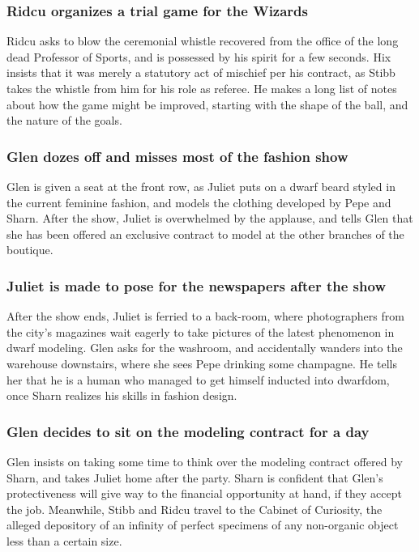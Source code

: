 \subsubsection{\Gls{Ridcu} organizes a trial game for the Wizards}
\Gls{Ridcu} asks to blow the ceremonial whistle recovered from the office of the long dead Professor
of Sports, and is possessed by his spirit for a few seconds. \Gls{Hix} insists that it was merely
a statutory act of mischief per his contract, as \Gls{Stibb} takes the whistle from him for his
role as referee. He makes a long list of notes about how the game might be improved, starting with
the shape of the ball, and the nature of the goals.

\subsubsection{\Gls{Glen} dozes off and misses most of the fashion show}
\Gls{Glen} is given a seat at the front row, as \Gls{Juliet} puts on a dwarf beard styled in the
current feminine fashion, and models the clothing developed by \Gls{Pepe} and \Gls{Sharn}. After
the show, \Gls{Juliet} is overwhelmed by the applause, and tells \Gls{Glen} that she has been
offered an exclusive contract to model at the other branches of the boutique.

\subsubsection{\Gls{Juliet} is made to pose for the newspapers after the show}
After the show ends, \Gls{Juliet} is ferried to a back-room, where photographers from the city's
magazines wait eagerly to take pictures of the latest phenomenon in dwarf modeling. \Gls{Glen} asks
for the washroom, and accidentally wanders into the warehouse downstairs, where she sees \Gls{Pepe}
drinking some champagne. He tells her that he is a human who managed to get himself inducted into
dwarfdom, once \Gls{Sharn} realizes his skills in fashion design.

\subsubsection{\Gls{Glen} decides to sit on the modeling contract for a day}
\Gls{Glen} insists on taking some time to think over the modeling contract offered by \Gls{Sharn},
and takes \Gls{Juliet} home after the party. \Gls{Sharn} is confident that \Gls{Glen}'s
protectiveness will give way to the financial opportunity at hand, if they accept the job.
Meanwhile, \Gls{Stibb} and \Gls{Ridcu} travel to the Cabinet of Curiosity, the alleged depository of
an infinity of perfect specimens of any non-organic object less than a certain size.

